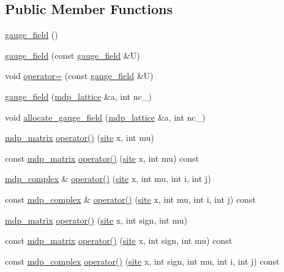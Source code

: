 \subsection*{Public Member Functions}
\begin{DoxyCompactItemize}
\item 
\hyperlink{classgauge__field_abdb50dfc413d1c22904a0ea38fc72e34}{gauge\+\_\+field} ()
\item 
\hyperlink{classgauge__field_a0500e23c8bd48d78650235e6ae668ab0}{gauge\+\_\+field} (const \hyperlink{classgauge__field}{gauge\+\_\+field} \&U)
\item 
void \hyperlink{classgauge__field_a1006054965a512e4dd06ca8c0b5c5d28}{operator=} (const \hyperlink{classgauge__field}{gauge\+\_\+field} \&U)
\item 
\hyperlink{classgauge__field_adcfa1a4c412dc26688307e95f3ed42b5}{gauge\+\_\+field} (\hyperlink{classmdp__lattice}{mdp\+\_\+lattice} \&a, int nc\+\_\+)
\item 
void \hyperlink{classgauge__field_ac7af990c989c01f0254a5454fc365dd7}{allocate\+\_\+gauge\+\_\+field} (\hyperlink{classmdp__lattice}{mdp\+\_\+lattice} \&a, int nc\+\_\+)
\item 
\hyperlink{classmdp__matrix}{mdp\+\_\+matrix} \hyperlink{classgauge__field_a765260519dece4a4ffafa338cbee22ae}{operator()} (\hyperlink{mdp__compatibility__macros_8h_aa6f1179c424e48adef1cedf7c436eb75}{site} x, int mu)
\item 
const \hyperlink{classmdp__matrix}{mdp\+\_\+matrix} \hyperlink{classgauge__field_a900ddca178e18fd0b9ad1e7569cf6646}{operator()} (\hyperlink{mdp__compatibility__macros_8h_aa6f1179c424e48adef1cedf7c436eb75}{site} x, int mu) const
\item 
\hyperlink{classmdp__complex}{mdp\+\_\+complex} \& \hyperlink{classgauge__field_a60a42ee4e59ad13f7bab46ba6f4ef2d9}{operator()} (\hyperlink{mdp__compatibility__macros_8h_aa6f1179c424e48adef1cedf7c436eb75}{site} x, int mu, int i, int j)
\item 
const \hyperlink{classmdp__complex}{mdp\+\_\+complex} \& \hyperlink{classgauge__field_a2bc7f601e96e278991f31089bc7a2935}{operator()} (\hyperlink{mdp__compatibility__macros_8h_aa6f1179c424e48adef1cedf7c436eb75}{site} x, int mu, int i, int j) const
\item 
\hyperlink{classmdp__matrix}{mdp\+\_\+matrix} \hyperlink{classgauge__field_a8d68963fa439cf58c3ac16c043523010}{operator()} (\hyperlink{mdp__compatibility__macros_8h_aa6f1179c424e48adef1cedf7c436eb75}{site} x, int sign, int mu)
\item 
const \hyperlink{classmdp__matrix}{mdp\+\_\+matrix} \hyperlink{classgauge__field_a330c596f8cf0371a653404eb5cdde6ce}{operator()} (\hyperlink{mdp__compatibility__macros_8h_aa6f1179c424e48adef1cedf7c436eb75}{site} x, int sign, int mu) const
\item 
const \hyperlink{classmdp__complex}{mdp\+\_\+complex} \hyperlink{classgauge__field_aa074a28da4cc4f762d0e7883a09a23f0}{operator()} (\hyperlink{mdp__compatibility__macros_8h_aa6f1179c424e48adef1cedf7c436eb75}{site} x, int sign, int mu, int i, int j) const
\end{DoxyCompactItemize}
